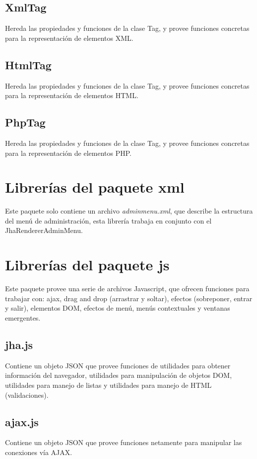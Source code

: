 \subsection{XmlTag}
Hereda las propiedades y funciones de la clase Tag, y provee funciones concretas para la representaci\'on de elementos XML.

\subsection{HtmlTag}
Hereda las propiedades y funciones de la clase Tag, y provee funciones concretas para la representaci\'on de elementos HTML.

\subsection{PhpTag}
Hereda las propiedades y funciones de la clase Tag, y provee funciones concretas para la representaci\'on de elementos PHP.

\section{Librer\'ias del paquete \textsf{xml}}
Este paquete solo contiene un archivo \textit{adminmenu.xml}, que describe la estructura del men\'u de administraci\'on, esta librer\'ia trabaja en conjunto con el JhaRendererAdminMenu.

\section{Librer\'ias del paquete \textsf{js}}
Este paquete provee una serie de archivos Javascript, que ofrecen funciones para trabajar con: ajax, drag and drop (arrastrar y soltar), efectos (sobreponer, entrar y salir), elementos DOM, efectos de men\'u, men\'us contextuales y ventanas emergentes.

\subsection{jha.js}
Contiene un objeto JSON que provee funciones de utilidades para obtener informaci\'on del navegador, utilidades para manipulaci\'on de objetos DOM, utilidades para manejo de listas y utilidades para manejo de HTML (validaciones).

\subsection{ajax.js}
Contiene un objeto JSON que provee funciones netamente para manipular las conexiones v\'ia AJAX.

